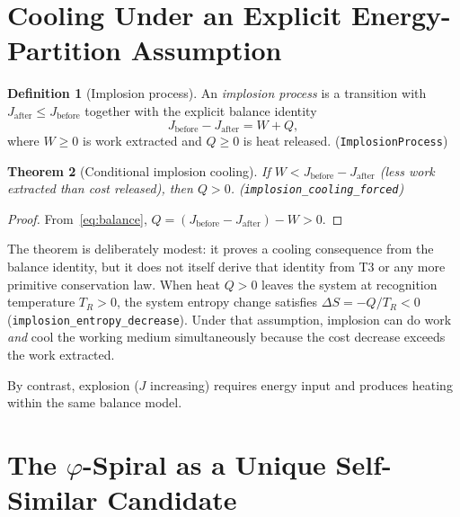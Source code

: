 \documentclass[11pt,a4paper]{article}
\newtheorem{theorem}{Theorem}[section]
\theoremstyle{definition}
\newtheorem{definition}[theorem]{Definition}
\newcommand{\phig}{\varphi}
\newcommand{\Jc}{J}
\newcommand{\TR}{T_{\!R}}
\newcommand{\code}[1]{\texttt{\small #1}}
\begin{document}
\section{Cooling Under an Explicit Energy-Partition Assumption}
\label{sec:cooling}

\begin{definition}[Implosion process]
An \emph{implosion process} is a transition with $\Jc_{\mathrm{after}} \le
\Jc_{\mathrm{before}}$ together with the explicit balance identity
\begin{equation}\label{eq:balance}
  \Jc_{\mathrm{before}} - \Jc_{\mathrm{after}} = W + Q,
\end{equation}
where $W \ge 0$ is work extracted and $Q \ge 0$ is heat released.
\textup{(\code{ImplosionProcess})}
\end{definition}

\begin{theorem}[Conditional implosion cooling]\label{thm:cooling}
If $W < \Jc_{\mathrm{before}} - \Jc_{\mathrm{after}}$ (less work
extracted than cost released), then $Q > 0$.
\textup{(\code{implosion\_cooling\_forced})}
\end{theorem}

\begin{proof}
From~\eqref{eq:balance}, $Q = (\Jc_{\mathrm{before}} - \Jc_{\mathrm{after}}) - W > 0$.
\end{proof}

The theorem is deliberately modest: it proves a cooling consequence from the
balance identity, but it does not itself derive that identity from T3 or any
more primitive conservation law.  When heat $Q > 0$ leaves the system at
recognition temperature $\TR > 0$, the system entropy change satisfies
$\Delta S = -Q/\TR < 0$ (\code{implosion\_entropy\_decrease}).  Under that
assumption, implosion can do work \emph{and} cool the working medium
simultaneously because the cost decrease exceeds the work extracted.

By contrast, explosion ($\Jc$ increasing) requires energy input and produces
heating within the same balance model.

\section{\texorpdfstring{The $\phig$-Spiral as a Unique Self-Similar Candidate}{The phi-Spiral as a Unique Self-Similar Candidate}}
\label{sec:phi-spiral}
\end{document}
